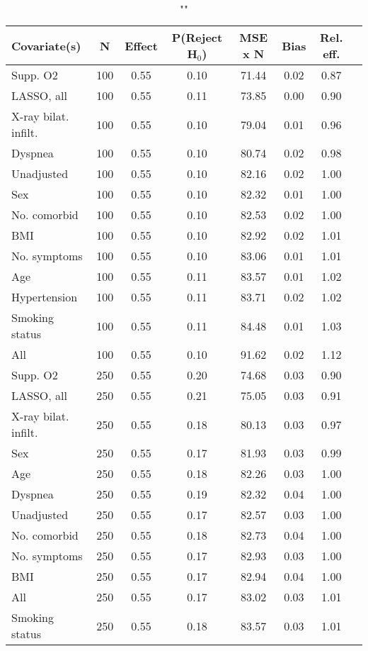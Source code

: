 \documentclass{article}
\begin{document}
{\tabcolsep=6pt  %
\begin{longtable}{lccccccc}
\caption{""} \\
Covariate(s) & N & Effect & P(Reject H$_0$) & MSE x N & Bias & Rel. eff.\\ \midrule
Supp. O2 & 100 & 0.55 & 0.10 & 71.44 & 0.02 & 0.87 \\ 
LASSO, all & 100 & 0.55 & 0.11 & 73.85 & 0.00 & 0.90 \\ 
X-ray bilat. infilt. & 100 & 0.55 & 0.10 & 79.04 & 0.01 & 0.96 \\ 
Dyspnea & 100 & 0.55 & 0.10 & 80.74 & 0.02 & 0.98 \\ 
Unadjusted & 100 & 0.55 & 0.10 & 82.16 & 0.02 & 1.00 \\ 
Sex & 100 & 0.55 & 0.10 & 82.32 & 0.01 & 1.00 \\ 
No. comorbid & 100 & 0.55 & 0.10 & 82.53 & 0.02 & 1.00 \\ 
BMI & 100 & 0.55 & 0.10 & 82.92 & 0.02 & 1.01 \\ 
No. symptoms & 100 & 0.55 & 0.10 & 83.06 & 0.01 & 1.01 \\ 
Age & 100 & 0.55 & 0.11 & 83.57 & 0.01 & 1.02 \\ 
Hypertension & 100 & 0.55 & 0.11 & 83.71 & 0.02 & 1.02 \\ 
Smoking status & 100 & 0.55 & 0.11 & 84.48 & 0.01 & 1.03 \\ 
All & 100 & 0.55 & 0.10 & 91.62 & 0.02 & 1.12 \\ \midrule 
Supp. O2 & 250 & 0.55 & 0.20 & 74.68 & 0.03 & 0.90 \\ 
LASSO, all & 250 & 0.55 & 0.21 & 75.05 & 0.03 & 0.91 \\ 
X-ray bilat. infilt. & 250 & 0.55 & 0.18 & 80.13 & 0.03 & 0.97 \\ 
Sex & 250 & 0.55 & 0.17 & 81.93 & 0.03 & 0.99 \\ 
Age & 250 & 0.55 & 0.18 & 82.26 & 0.03 & 1.00 \\ 
Dyspnea & 250 & 0.55 & 0.19 & 82.32 & 0.04 & 1.00 \\ 
Unadjusted & 250 & 0.55 & 0.17 & 82.57 & 0.03 & 1.00 \\ 
No. comorbid & 250 & 0.55 & 0.18 & 82.73 & 0.04 & 1.00 \\ 
No. symptoms & 250 & 0.55 & 0.17 & 82.93 & 0.03 & 1.00 \\ 
BMI & 250 & 0.55 & 0.17 & 82.94 & 0.04 & 1.00 \\ 
All & 250 & 0.55 & 0.17 & 83.02 & 0.03 & 1.01 \\ 
Smoking status & 250 & 0.55 & 0.18 & 83.57 & 0.03 & 1.01 \\ 

\end{longtable}}
\end{document}
